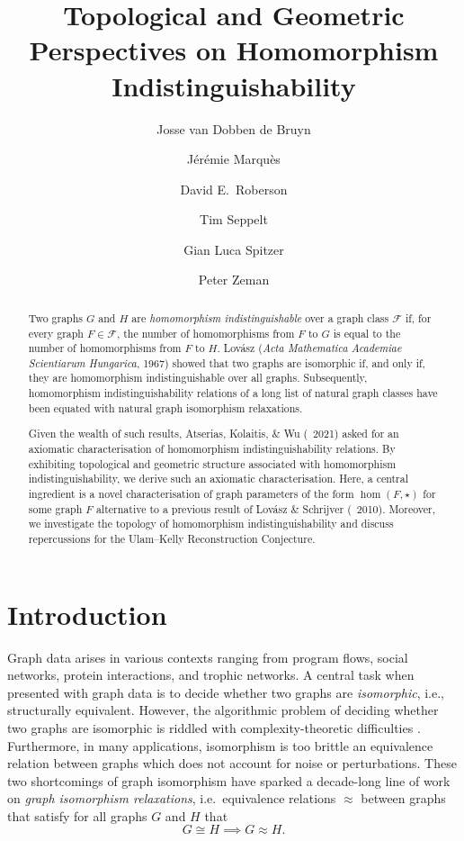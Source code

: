 \documentclass[11pt]{scrartcl}
\title{Topological and Geometric Perspectives on Homomorphism Indistinguishability}
\author[1]{Josse van Dobben de Bruyn}
\author[2]{J\'er\'emie Marqu\`es}
\author[3]{David E.\ Roberson}
\author[4]{Tim Seppelt}
\author[5]{Gian Luca Spitzer}
\author[1]{Peter Zeman}
\affil[1]{Charles University, Czech Republic}
\affil[2]{Université Côte d'Azur, France}
\affil[3]{Technical University of Denmark}
\affil[4]{IT-Universitetet i København, Denmark}
\affil[5]{Université de Bordeaux, France}
\theoremstyle{definition}
\theoremstyle{plain}
\theoremstyle{remark}
\begin{document}
	\maketitle
    

	\begin{abstract}
		Two graphs $G$ and $H$ are \emph{homomorphism indistinguishable}
		over a graph class $\mathcal{F}$ if, for every graph $F \in \mathcal{F}$,
		the number of homomorphisms from $F$ to $G$ is equal to the number of homomorphisms from $F$ to $H$.
		Lov\'asz (\emph{Acta Mathematica Academiae Scientiarum Hungarica}, 1967)
		showed that two graphs are isomorphic if, and only if, they are homomorphism indistinguishable over all graphs.
		Subsequently, homomorphism indistinguishability relations of a long list of natural graph classes have been equated 
		with natural graph isomorphism relaxations.

		Given the wealth of such results,
		Atserias, Kolaitis, \& Wu (~2021)
		asked for an axiomatic characterisation of homomorphism indistinguishability relations.
		By exhibiting topological and geometric structure associated with homomorphism indistinguishability,
		we derive such an axiomatic characterisation.
        Here, a central ingredient is a novel characterisation of graph parameters of the form $\hom(F, \star)$ for some graph $F$ alternative to a previous result of Lov\'asz \& Schrijver (~2010).
		Moreover, we investigate the topology of homomorphism indistinguishability and
		discuss repercussions for the Ulam--Kelly Reconstruction Conjecture.
	\end{abstract}

    \nocite{lovasz_operations_1967,atserias_expressive_2021,lovasz_dual_2010}

	

	\section{Introduction}

	

	Graph data arises in various contexts ranging from program flows, social networks, protein interactions, and trophic networks.
	A central task when presented with graph data is to decide whether two graphs are \emph{isomorphic}, i.e.,
	structurally equivalent.
	However, the algorithmic problem of deciding whether two graphs are isomorphic is riddled with
	complexity-theoretic difficulties \cite{grohe_graph_2020}.
	Furthermore, in many applications, isomorphism is too brittle an equivalence relation between graphs which does not account for noise or perturbations.
	These two shortcomings of graph isomorphism have sparked a decade-long line of work 
	on \emph{graph isomorphism relaxations}, i.e.\
	equivalence relations $\approx$ between graphs that satisfy
	for all graphs $G$ and $H$ that
	\begin{equation} \label{eq:graph-iso-relax}
		G \cong H \implies G \approx H.
	\end{equation}
\end{document}
